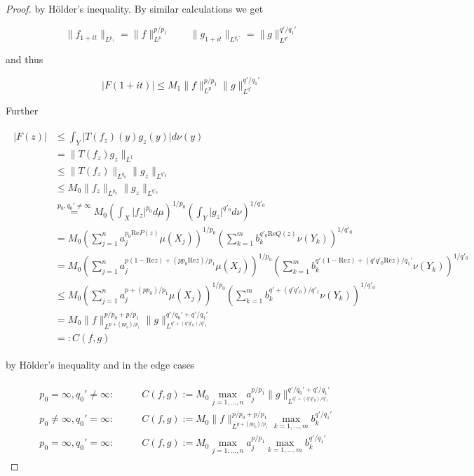 \begin{proof}
				by H\"older's inequality. By similar calculations we get 
				
				\begin{equation}
					\|f_{1 + it}\|_{L^{p_1}} = \|f\|_{L^p}^{p/p_1} \qquad \|g_{1 + it}\|_{L^{q_1'}} = \|g\|_{L^{q'}}^{q'/q_1'}
				\end{equation}

				and thus 
				
				\begin{equation}
					\vert F(1 + it)\vert \leqslant M_1 \|f\|_{L^p}^{p/p_1}\|g\|_{L^{q'}}^{q'/q_1'}
				\end{equation}	

				Further 
		
		\begin{gather*}
			\begin{aligned}
				\vert F(z)\vert &\leqslant \int_Y\vert T(f_z)(y)g_z(y)\vert d\nu(y)\\
				&= \|T(f_z)g_z\|_{L^1}\\
				&\leqslant \|T(f_z)\|_{L^{q_0}} \|g_z\|_{L^{q'_0}}\\
				&\leqslant M_0 \|f_z\|_{L^{p_0}} \|g_z\|_{L^{q'_0}}\\
				&\overset{p_0,q_0' \neq \infty}{=} M_0 \left(\int_X \vert f_z \vert^{p_0} d\mu\right)^{1/p_0} \left(\int_Y \vert g_z \vert^{q'_0} d\nu\right)^{1/q'_0}\\
				&= M_0 \left( \sum\limits_{j = 1}^n a_j^{p_0\mathrm{Re}P(z)}\mu(X_j) \right)^{1/p_0} \left( \sum\limits_{k = 1}^m b_k^{q'_0\mathrm{Re}Q(z)} \nu(Y_k) \right)^{1/q'_0}\\
				&= M_0 \left( \sum\limits_{j = 1}^n a_j^{p(1 - \mathrm{Re}z) + (pp_0\mathrm{Re}z)/p_1}\mu(X_j) \right)^{1/p_0} \left( \sum\limits_{k = 1}^m b_k^{q'(1 - \mathrm{Re}z) + (q'q'_0\mathrm{Re} z)/q_1'} \nu(Y_k) \right)^{1/q'_0}\\
				&\leqslant M_0 \left( \sum\limits_{j = 1}^n a_j^{p + (pp_0)/p_1}\mu(X_j) \right)^{1/p_0} \left( \sum\limits_{k = 1}^m b_k^{q' + (q'q'_0)/q'_1} \nu(Y_k) \right)^{1/q'_0}\\
				&= M_0 \|f\|_{L^{p + (pp_0)/p_1}}^{p/p_0 + p/p_1} \|g\|_{L^{q' + (q'q'_0)/q'_1}}^{q'/q_0' + q'/q_1'}\\
				&=: C(f,g)
			\end{aligned}
		\end{gather*}
		
		
		by H\"older's inequality and in the edge cases
		
		\begin{gather*}
			\begin{aligned}
				&p_0 = \infty, q_0' \neq \infty: \qquad & C(f,g) := M_0 \max_{j = 1,\hdots,n} a_j^{p/p_1} \|g\|_{L^{q' + (q'q'_0)/q'_1}}^{q'/q_0' + q'/q_1'}\\
				&p_0 \neq \infty, q_0' = \infty: & C(f,g) :=  M_0 \|f\|_{L^{p + (pp_0)/p_1}}^{p/p_0 + p/p_1} \max_{k = 1,\hdots,m} b_k^{q'/q_1'}\\
				&p_0 = \infty, q_0' = \infty: & C(f,g) := M_0 \max_{j = 1,\hdots,n} a_j^{p/p_1} \max_{k = 1,\hdots,m} b_k^{q'/q_1'}
			\end{aligned}
		\end{gather*}
		

\end{proof}
